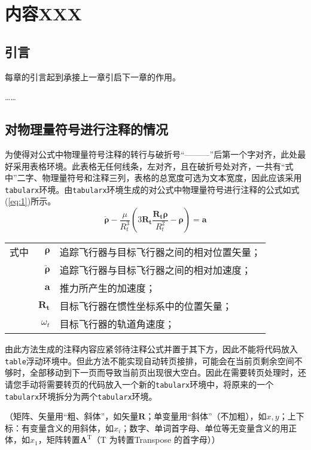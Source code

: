 
\chapter{内容XXX}

\section{引言}

每章的引言起到承接上一章引启下一章的作用。

\ldots\ldots

\section{对物理量符号进行注释的情况}

为使得对公式中物理量符号注释的转行与破折号“———”后第一个字对齐，此处最好采用表格环境。此表格无任何线条，左对齐，且在破折号处对齐，一共有“式中”二字、物理量符号和注释三列，表格的总宽度可选为文本宽度，因此应该采用\verb|tabularx|环境。由\verb|tabularx|环境生成的对公式中物理量符号进行注释的公式如式(\ref{eq:1})所示。
\begin{equation}\label{eq:1}
\ddot{\bm{\rho}}-\frac{\mu}{R_{t}^{3}}\left(3\bm{R_{t}}\frac{\bm{R_{t}\rho}}{R_{t}^{2}}-\bm{\rho}\right)=\bm{a}
\end{equation}
\begin{tabularx}{\textwidth}{@{}l@{\quad}r@{———}X@{}}
式中& $\bm{\rho}$ &追踪飞行器与目标飞行器之间的相对位置矢量；\\
&  $\bm{\ddot{\rho}}$&追踪飞行器与目标飞行器之间的相对加速度；\\
&  $\bm{a}$   &推力所产生的加速度；\\
&  $\bm{R_t}$ & 目标飞行器在惯性坐标系中的位置矢量；\\
&  $\omega_{t}$ & 目标飞行器的轨道角速度；\\
\end{tabularx}\vspace{3.15bp}
由此方法生成的注释内容应紧邻待注释公式并置于其下方，因此不能将代码放入\verb|table|浮动环境中。但此方法不能实现自动转页接排，可能会在当前页剩余空间不够时，全部移动到下一页而导致当前页出现很大空白。因此在需要转页处理时，还请您手动将需要转页的代码放入一个新的\verb|tabularx|环境中，将原来的一个\verb|tabularx|环境拆分为两个\verb|tabularx|环境。

{\color{red}（矩阵、矢量用“粗、斜体”，如矢量$\bm{R}$；单变量用“斜体”（不加粗），如$x,y$；上下标：有变量含义的用斜体，如$x_i$；数字、单词首字母、单位等无变量含义的用正体，如$x_1$，矩阵转置$\bm{A}^{\text{T}}$（T 为转置Transpose 的首字母））}

